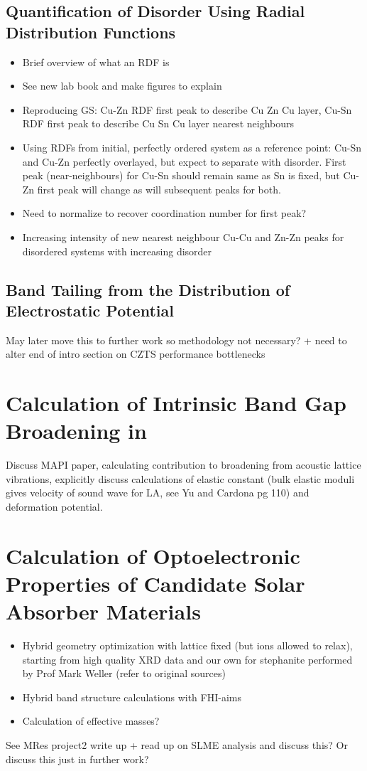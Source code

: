 \subsection{Quantification of Disorder Using Radial Distribution Functions}\label{RDF_methods}
\begin{itemize}
\item Brief overview of what an RDF is
\item See new lab book and make figures to explain
\item Reproducing GS: Cu-Zn RDF first peak to describe Cu Zn Cu layer, Cu-Sn RDF first peak to describe Cu Sn Cu layer nearest neighbours
\item Using RDFs from initial, perfectly ordered system as a reference point: Cu-Sn and Cu-Zn perfectly overlayed, but expect to separate with disorder. First peak (near-neighbours) for Cu-Sn should remain same as Sn is fixed, but Cu-Zn first peak will change as will subsequent peaks for both.
\item Need to normalize to recover coordination number for first peak?
\item Increasing intensity of new nearest neighbour Cu-Cu and Zn-Zn peaks for disordered systems with increasing disorder
\end{itemize}


\subsection{Band Tailing from the Distribution of Electrostatic Potential}
May later move this to further work so methodology not necessary? + need to alter end of intro section on CZTS performance bottlenecks




\section{Calculation of Intrinsic Band Gap Broadening in \CZTS} \label{band_gap_broadening}
Discuss MAPI paper, calculating contribution to broadening from acoustic lattice vibrations, explicitly discuss calculations of elastic constant (bulk elastic moduli gives velocity of sound wave for LA, see Yu and Cardona pg 110) and deformation potential.


\section{Calculation of Optoelectronic Properties of Candidate Solar Absorber Materials}\label{properties_methods}
\begin{itemize}
\item Hybrid geometry optimization with lattice fixed (but ions allowed to relax), starting from high quality XRD data and our own for stephanite performed by Prof Mark Weller (refer to original sources)
\item Hybrid band structure calculations with FHI-aims
\item Calculation of effective masses?
\end{itemize}

See MRes project2 write up + read up on SLME analysis and discuss this? Or discuss this just in further work?

                            